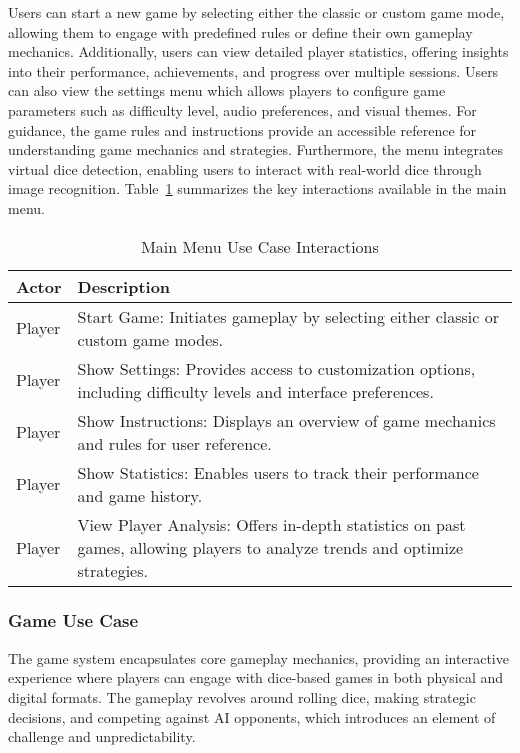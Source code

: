 Users can start a new game by selecting either the classic or custom game mode, allowing them to engage with predefined rules or define their own gameplay mechanics. Additionally, users can view detailed player statistics, offering insights into their performance, achievements, and progress over multiple sessions. Users can also view the settings menu which allows players to configure game parameters such as difficulty level, audio preferences, and visual themes. For guidance, the game rules and instructions provide an accessible reference for understanding game mechanics and strategies. Furthermore, the menu integrates virtual dice detection, enabling users to interact with real-world dice through image recognition. Table~\ref{tab:main_menu_usecase} summarizes the key interactions available in the main menu.

\begin{table}[ht!]
    \centering
    \begin{tabular}{|l|p{10cm}|}
        \hline
        \textbf{Actor} & \textbf{Description} \\
        \hline
        Player & Start Game: Initiates gameplay by selecting either classic or custom game modes. \\
        \hline
        Player & Show Settings: Provides access to customization options, including difficulty levels and interface preferences. \\
        \hline
        Player & Show Instructions: Displays an overview of game mechanics and rules for user reference. \\
        \hline
        Player & Show Statistics: Enables users to track their performance and game history. \\
        \hline
        Player & View Player Analysis: Offers in-depth statistics on past games, allowing players to analyze trends and optimize strategies. \\
        \hline
    \end{tabular}
    \caption{Main Menu Use Case Interactions}
    \label{tab:main_menu_usecase}
\end{table}

\subsubsection{Game Use Case}

The game system encapsulates core gameplay mechanics, providing an interactive experience where players can engage with dice-based games in both physical and digital formats. The gameplay revolves around rolling dice, making strategic decisions, and competing against AI opponents, which introduces an element of challenge and unpredictability.

